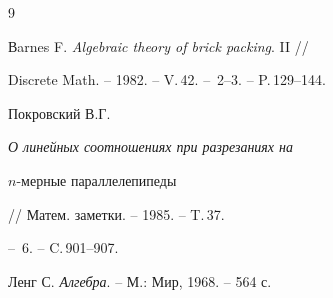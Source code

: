  


\begin{thebibliography}{9} 


 




Вarnes F. {\em Algebraic theory of brick packing}. II // 


Discrete Math. -- 1982. -- V.\,42. -- \No\,2--3. -- P.\,129--144. 




Покровский В.Г. {\em О линейных соотношениях при разрезаниях на  


$n$-мерные параллелепипеды} // Матем. заметки. -- 1985. -- T.\,37. 


-- \No\,6. -- C.\,901--907. 




Ленг С. {\em Алгебра}. -- М.: Мир, 1968. -- 564 с. 


 


\end{thebibliography} 


 


\vskip 2cm 


 






 


\label{end} 


 


